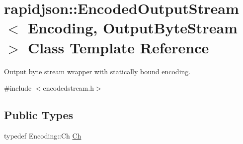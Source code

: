 \hypertarget{classrapidjson_1_1_encoded_output_stream}{}\section{rapidjson\+::Encoded\+Output\+Stream$<$ Encoding, Output\+Byte\+Stream $>$ Class Template Reference}
\label{classrapidjson_1_1_encoded_output_stream}


Output byte stream wrapper with statically bound encoding.  




{\ttfamily \#include $<$encodedstream.\+h$>$}

\subsection*{Public Types}
\begin{DoxyCompactItemize}
\item 
typedef Encoding\+::\+Ch \mbox{\hyperlink{classrapidjson_1_1_encoded_output_stream_aa96ac761f570fbdbcc2375ad4edd8b6f}{Ch}}
\end{DoxyCompactItemize}
